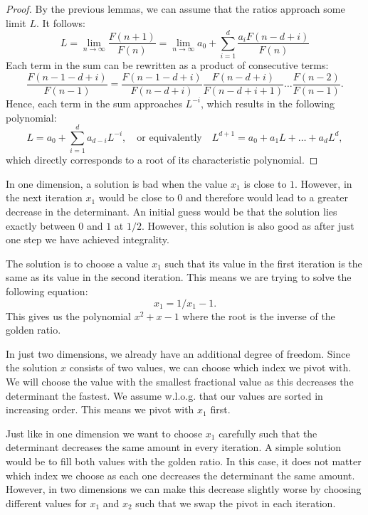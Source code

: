 \documentclass[english,version-2020-11]{uzl-thesis}
\begin{document}
\begin{proof}
  By the previous lemmas, we can assume that the ratios approach some limit $L$.
  It follows:
  \[
    L
    = \lim_{n \to \infty} \frac{F(n + 1)}{F(n)}
    = \lim_{n \to \infty} a_0 + \sum_{i = 1}^d \frac{a_i F(n - d + i)}{F(n)}
  \]
  Each term in the sum can be rewritten as a product of consecutive terms:
  \[
    \frac{F(n - 1 - d + i)}{F(n - 1)}
    = \frac{F(n - 1 - d + i)}{F(n - d + i)} \frac{F(n - d + i)}{F(n - d + i + 1)} \dots \frac{F(n - 2)}{F(n-1)}.
  \]
  Hence, each term in the sum approaches $L^{-i}$,
  which results in the following polynomial:
  \[
    L = a_0 + \sum_{i = 1}^d a_{d - i} L^{-i},
    \quad \text{or equivalently} \quad
    L^{d+1} = a_0 + a_1 L + \dots + a_d L^d,
  \]
  which directly corresponds to a root of its characteristic polynomial.
\end{proof}

In one dimension, a solution is bad when the value $x_1$ is close to $1$.
However, in the next iteration $x_1$ would be close to $0$ and therefore
would lead to a greater decrease in the determinant.
An initial guess would be that the solution lies exactly between $0$ and $1$ at $1/2$.
However, this solution is also good as after just one step we have achieved integrality.

The solution is to choose a value $x_1$ such that its value in the first
iteration is the same as its value in the second iteration.
This means we are trying to solve the following equation:
\[
  x_1 = 1/x_1 - 1.
\]
This gives us the polynomial $x^2 + x - 1$ where the root is the inverse of the
golden ratio.

In just two dimensions, we already have an additional degree of freedom.
Since the solution $x$ consists of two values, we can choose which index we pivot with.
We will choose the value with the smallest fractional value as this decreases
the determinant the fastest.
We assume w.l.o.g. that our values are sorted in increasing order.
This means we pivot with $x_1$ first.

Just like in one dimension we want to choose $x_1$ carefully such that the
determinant decreases the same amount in every iteration.
A simple solution would be to fill both values with the golden ratio.
In this case, it does not matter which index we choose as each one decreases
the determinant the same amount.
However, in two dimensions we can make this decrease slightly worse
by choosing different values for $x_1$ and $x_2$ such that we swap the pivot
in each iteration.
\end{document}
